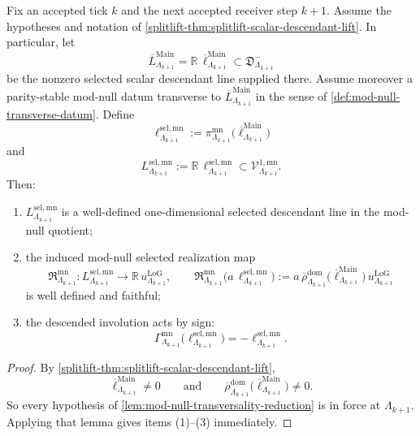 \documentclass[11pt]{article}
\begin{document}
\begin{theorem}
\label{thm:conditional-mod-null-reentry}
Fix an accepted tick \(k\) and the next accepted receiver step \(k+1\).
Assume the hypotheses and notation of
\cref{splitlift-thm:splitlift-scalar-descendant-lift}.
In particular, let
\[
\overline L^{\mathrm{Main}}_{\Lambda_{k+1}}
=
\mathbb R\,\overline\ell^{\mathrm{Main}}_{\Lambda_{k+1}}
\subset
\mathfrak D^-_{\Lambda_{k+1}}
\]
be the nonzero selected scalar descendant line supplied there.
Assume moreover a parity-stable mod-null datum transverse to
\(
\overline L^{\mathrm{Main}}_{\Lambda_{k+1}}
\)
in the sense of \cref{def:mod-null-transverse-datum}.
Define
\[
\ell^{\mathrm{sel,mn}}_{\Lambda_{k+1}}
:=
\pi^{\mathrm{mn}}_{\Lambda_{k+1}}
\!\bigl(
\overline\ell^{\mathrm{Main}}_{\Lambda_{k+1}}
\bigr)
\]
and
\[
L^{\mathrm{sel,mn}}_{\Lambda_{k+1}}
:=
\mathbb R\,\ell^{\mathrm{sel,mn}}_{\Lambda_{k+1}}
\subset
\mathcal V^{1,\mathrm{mn}}_{\Lambda_{k+1}}.
\]
Then:
\begin{enumerate}[leftmargin=2em]
\item \(L^{\mathrm{sel,mn}}_{\Lambda_{k+1}}\) is a well-defined one-dimensional selected descendant
  line in the mod-null quotient;
\item the induced mod-null selected realization map
  \[
  \mathfrak R^{\mathrm{mn}}_{\Lambda_{k+1}}:
  L^{\mathrm{sel,mn}}_{\Lambda_{k+1}}
  \longrightarrow
  \mathbb R\,u^{\mathrm{LoG}}_{\Lambda_{k+1}},
  \qquad
  \mathfrak R^{\mathrm{mn}}_{\Lambda_{k+1}}
  \!\bigl(
  a\,\ell^{\mathrm{sel,mn}}_{\Lambda_{k+1}}
  \bigr)
  :=
  a\,
  \overline{\rho}^{\mathrm{dom}}_{\Lambda_{k+1}}
  \!\bigl(
  \overline\ell^{\mathrm{Main}}_{\Lambda_{k+1}}
  \bigr)\,
  u^{\mathrm{LoG}}_{\Lambda_{k+1}}
  \]
  is well defined and faithful;
\item the descended involution acts by sign:
  \[
  \Gamma^{\mathrm{mn}}_{\Lambda_{k+1}}
  \!\bigl(
  \ell^{\mathrm{sel,mn}}_{\Lambda_{k+1}}
  \bigr)
  =
  -
  \ell^{\mathrm{sel,mn}}_{\Lambda_{k+1}}.
  \]
\end{enumerate}
\end{theorem}

\begin{proof}
By \cref{splitlift-thm:splitlift-scalar-descendant-lift},
\[
\overline\ell^{\mathrm{Main}}_{\Lambda_{k+1}}\neq 0
\qquad\text{and}\qquad
\overline{\rho}^{\mathrm{dom}}_{\Lambda_{k+1}}
\!\bigl(
\overline\ell^{\mathrm{Main}}_{\Lambda_{k+1}}
\bigr)
\neq 0.
\]
So every hypothesis of
\cref{lem:mod-null-transversality-reduction}
is in force at \(\Lambda_{k+1}\).
Applying that lemma gives items \textnormal{(1)}--\textnormal{(3)} immediately.
\end{proof}
\end{document}
